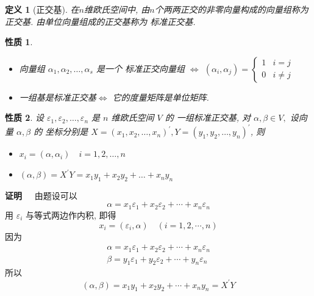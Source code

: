 \documentclass[13pt]{beamer}
\newtheorem*{defi}{定义}
\newtheorem*{prop}{性质}
\def\pf{{\bf 证明~~ }}
\begin{document}
\begin{frame}
\begin{defi}[正交基]
	在$n$维欧氏空间中, 由$n$个两两正交的非零向量构成的向量组称为 \alert{正交基}. 
	由单位向量组成的正交基称为 \alert{标准正交基}.
	
\end{defi}


\begin{prop}
	\begin{itemize}
		\item 向量组 $\alpha_{1}, \alpha_{2}, \ldots, \alpha_{s}$ 是一个
		标准正交向量组
		$\Longleftrightarrow$ 
		$\left(\alpha_{i}, \alpha_{j}\right)=\left\{\begin{array}{ll} 
		{1} & {i}={j} \\ 
		{0} & {i} \neq {j}
		\end{array}\right.$
		\item 	一组基是标准正交基$\Longleftrightarrow$ 它的度量矩阵是单位矩阵. 
	\end{itemize}
\end{prop}

\end{frame}
\begin{frame}
\begin{prop}
	设 $\varepsilon_{1}, \varepsilon_{2}, \dots, \varepsilon_{n}$ 是 $n$ 维欧氏空间 $V$ 的
	一组标准正交基, 对 $\alpha, \beta \in V,$ 设向量 $\alpha, \beta$ 的 坐标分别是 $X=\left(x_{1}, x_{2}, \ldots, x_{n}\right)^{\prime}, Y=\left(y_{1}, y_{2}, \ldots, y_{n}\right)^{\prime}$, 则
	\begin{itemize}
		\item $x_{i}=\left(\alpha, \alpha_{i}\right) \quad i=1,2, \dots, n$
		\item  $(\alpha, \beta)=X^{\prime} Y=x_{1} y_{1}+x_{2} y_{2}+\ldots+x_{n} y_{n}$
	\end{itemize}
\end{prop}

\pf 
\small{
由题设可以
	\[
	{\alpha}=x_{1} {\varepsilon}_{1}+x_{2} {\varepsilon}_{2}+\cdots+{x}_{n} {\varepsilon}_{n}
	\]
	用 ${\varepsilon}_{i}$ 与等式两边作内积, 即得
	\[
	x_{i}=\left({\varepsilon}_{i}, {\alpha}\right) \quad(i=1,2, \cdots, n)
	\]
因为
	\[
	\begin{array}{l}
	{\alpha}=x_{1} {\varepsilon}_{1}+x_{2} {\varepsilon}_{2}+\cdots+x_{n} {\varepsilon}_{n} \\
	{\beta}=y_{1} {\varepsilon}_{1}+y_{2} {\varepsilon}_{2}+\cdots+y_{n} {\varepsilon}_{n}
	\end{array}
	\]
所以
	\[
	({\alpha}, {\beta})=x_{1} y_{1}+x_{2} y_{2}+\cdots+x_{n} y_{n}={X}^{\prime} {Y}
	\]}
\end{frame}
\end{document}
